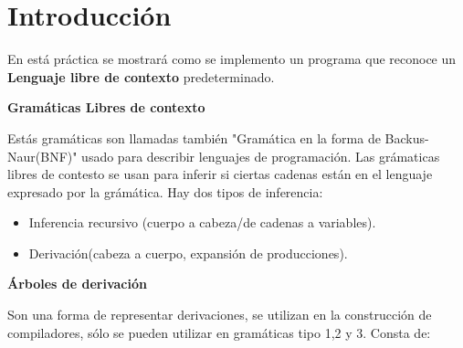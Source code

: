 \documentclass[12pt]{article}
\begin{document}

	\section{Introducción}

	En está práctica se mostrará como se implemento un programa que
	reconoce un \textbf{Lenguaje libre de contexto} predeterminado.

	\textbf{Gramáticas Libres de contexto}

	Estás gramáticas son llamadas también "Gramática en la forma de 
	Backus-Naur(BNF)" usado para describir lenguajes de programación.
	Las grámaticas libres de contesto se usan para inferir si ciertas 
	cadenas están en el lenguaje expresado por la grámática. Hay dos
	tipos de inferencia:

	\begin{itemize}
		\item Inferencia recursivo (cuerpo a cabeza/de cadenas a variables).
		\item Derivación(cabeza a cuerpo, expansión de producciones).
	\end{itemize} 
	
	\textbf{Árboles de derivación}

	Son una forma de representar derivaciones, se utilizan en la 
	construcción de compiladores, sólo se pueden utilizar en gramáticas
	tipo 1,2 y 3. Consta de:
\end{document}
